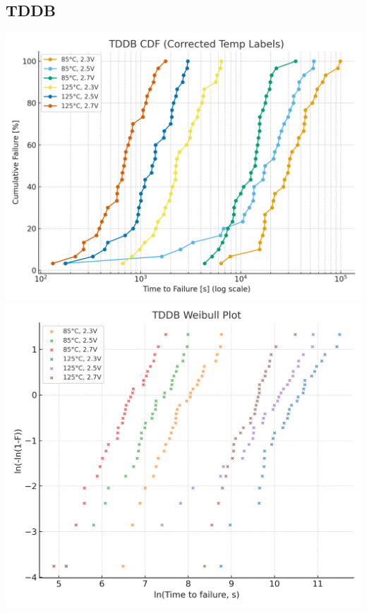 \documentclass[conference]{IEEEtran}
\begin{document}
\subsection{TDDB}
\includegraphics[width=\linewidth]{figures/fig4_tddb_cdf.png}
\includegraphics[width=\linewidth]{figures/fig4_tddb_weibull.png}
\end{document}
